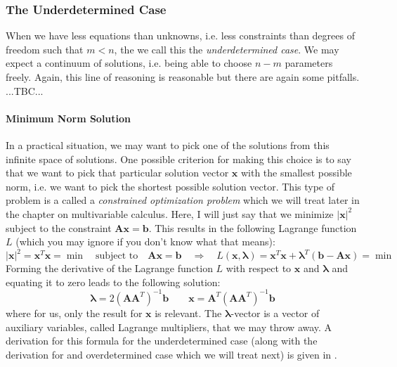 
\subsubsection{The Underdetermined Case}
When we have less equations than unknowns, i.e. less constraints than degrees of freedom such that $m < n$, the we call this the \emph{underdetermined case}. We may expect a continuum of solutions, i.e. being able to choose $n-m$ parameters freely. Again, this line of reasoning is reasonable but there are again some pitfalls. ...TBC...

\paragraph{Minimum Norm Solution}
In a practical situation, we may want to pick one of the solutions from this infinite space of solutions. One possible criterion for making this choice is to say that we want to pick that particular solution vector $\mathbf{x}$ with the smallest possible norm, i.e. we want to pick the shortest possible solution vector. This type of problem is a called a \emph{constrained optimization problem} which we will treat later in the chapter on multivariable calculus. Here, I will just say that we minimize $|\mathbf{x}|^2$ subject to the constraint $\mathbf{A x} = \mathbf{b}$. This results in the following Lagrange function $L$ (which you may ignore if you don't know what that means):
\begin{equation}
|\mathbf{x}|^2 = \mathbf{x}^T \mathbf{x} = \min 
\quad \text{subject to} \quad 
\mathbf{A x} = \mathbf{b}
\quad \Rightarrow \quad
L(\mathbf{x}, \boldsymbol{\lambda}) 
= \mathbf{x}^T \mathbf{x} + \boldsymbol{\lambda}^T (\mathbf{b} - \mathbf{A x}) = \min
\end{equation}
Forming the derivative of the Lagrange function $L$ with respect to $\mathbf{x}$ and $\boldsymbol{\lambda}$ and equating it to zero leads to the following solution:
\begin{equation}
\boldsymbol{\lambda} = 2 (\mathbf{A} \mathbf{A}^T)^{-1} \mathbf{b}
\qquad
\boxed{\mathbf{x} = \mathbf{A}^T (\mathbf{A} \mathbf{A}^T)^{-1} \mathbf{b}}
\end{equation}
where for us, only the result for $\mathbf{x}$ is relevant. The $\boldsymbol{\lambda}$-vector is a vector of auxiliary variables, called Lagrange multipliers, that we may throw away. A derivation for this formula for the underdetermined case (along with the derivation for and overdetermined case which we will treat next) is given in \cite{LinSysOverUnder}.

